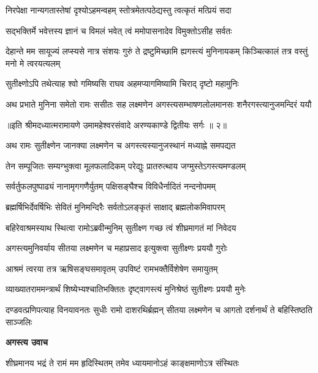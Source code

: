 \twolineshloka
{निरपेक्षा नान्यगतास्तेषां दृश्योऽहमन्वहम्}
{स्तोत्रमेतत्पठेद्यस्तु त्वत्कृतं मत्प्रियं सदा} %

\twolineshloka
{सद्भक्तिर्मे भवेत्तस्य ज्ञानं च विमलं भवेत्}
{त्वं ममोपासनादेव विमुक्तोऽसीह सर्वतः} %

\threelineshloka
{देहान्ते मम सायूज्यं लप्स्यसे नात्र संशयः}
{गुरुं ते द्रष्टुमिच्छामि ह्यगस्त्यं मुनिनायकम्}
{किञ्चित्कालं तत्र वस्तुं मनो मे त्वरयत्यलम्} %

\twolineshloka
{सुतीक्ष्णोऽपि तथेत्याह श्वो गमिष्यसि राघव}
{अहमप्यागमिष्यामि चिराद् दृष्टो महामुनिः} %

\fourlineindentedshloka
{अथ प्रभाते मुनिना समेतो}
{रामः ससीतः सह लक्ष्मणेन}
{अगस्त्यसम्भाषणलोलमानसः}
{शनैरगस्त्यानुजमन्दिरं ययौ} %

{॥इति श्रीमदध्यात्मरामायणे उमामहेश्वरसंवादे
अरण्यकाण्डे द्वितीयः सर्गः ॥ २॥
}




\twolineshloka
{अथ रामः सुतीक्ष्णेन जानक्या लक्ष्मणेन च}
{अगस्त्यस्यानुजस्थानं मध्याह्ने समपद्यत} %

\twolineshloka
{तेन सम्पूजितः सम्यग्भुक्त्वा मूलफलादिकम्}
{परेद्युः प्रातरुत्थाय जग्मुस्तेऽगस्त्यमण्डलम्} %

\twolineshloka
{सर्वर्तुफलपुष्पाढ्यं नानामृगगणैर्युतम्}
{पक्षिसङ्घैश्च विविधैर्नादितं नन्दनोपमम्} %

\twolineshloka
{ब्रह्मर्षिभिर्देवर्षिभिः सेवितं मुनिमन्दिरैः}
{सर्वतोऽलङ्कृतं साक्षाद् ब्रह्मलोकमिवापरम्} %

\twolineshloka
{बहिरेवाश्रमस्याथ स्थित्वा रामोऽब्रवीन्मुनिम्}
{सुतीक्ष्ण गच्छ त्वं शीघ्रमागतं मां निवेदय} %

\twolineshloka
{अगस्त्यमुनिवर्याय सीतया लक्ष्मणेन च}
{महाप्रसाद इत्युक्त्वा सुतीक्ष्णः प्रययौ गुरोः} %

\twolineshloka
{आश्रमं त्वरया तत्र ऋषिसङ्घसमावृतम्}
{उपविष्टं रामभक्तैर्विशेषेण समायुतम्} %

\twolineshloka
{व्याख्यातराममन्त्रार्थं शिष्येभ्यश्चातिभक्तितः}
{दृष्ट्वागस्त्यं मुनिश्रेष्ठं सुतीक्ष्णः प्रययौ मुनेः} %

\threelineshloka
{दण्डवत्प्रणिपत्याह विनयावनतः सुधीः}
{रामो दाशरथिर्ब्रह्मन् सीतया लक्ष्मणेन च}
{आगतो दर्शनार्थं ते बहिस्तिष्ठति साञ्जलिः} %

\textbf{अगस्त्य उवाच}

\twolineshloka
{शीघ्रमानय भद्रं ते रामं मम हृदिस्थितम्}
{तमेव ध्यायमानोऽहं काङ्क्षमाणोऽत्र संस्थितः} %

